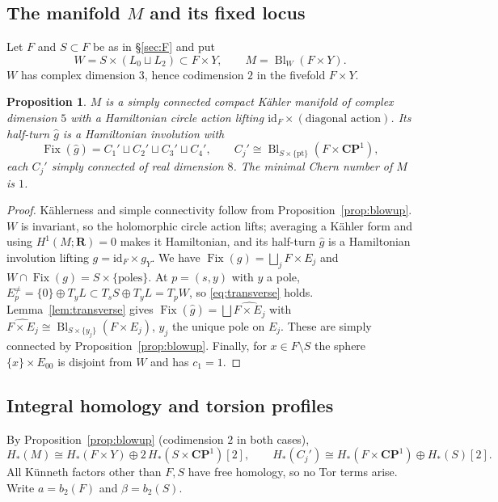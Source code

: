 \documentclass[11pt]{amsart}
\numberwithin{equation}{section}
\newtheorem{proposition}[theorem]{Proposition}
\theoremstyle{definition}
\theoremstyle{remark}
\newcommand{\CP}{\mathbf{CP}}
\newcommand{\R}{\mathbf R}
\DeclareMathOperator{\Fix}{Fix}
\DeclareMathOperator{\Bl}{Bl}
\newcommand{\id}{\mathrm{id}}
\begin{document}
\subsection{The manifold $M$ and its fixed locus}

Let $F$ and $S\subset F$ be as in \S\ref{sec:F} and put
\[
  W=S\times(L_0\sqcup L_2)\subset F\times Y,\qquad
  M=\Bl_W(F\times Y).
\]
$W$ has complex dimension $3$, hence codimension $2$ in the fivefold
$F\times Y$.

\begin{proposition}\label{prop:Mprops}
$M$ is a simply connected compact K\"ahler manifold of complex dimension
$5$ with a Hamiltonian circle action lifting $\id_F\times(\text{diagonal
action})$. Its half-turn $\hat g$ is a Hamiltonian involution with
\[
  \Fix(\hat g)=C_1'\sqcup C_2'\sqcup C_3'\sqcup C_4',\qquad
  C_j'\cong\Bl_{S\times\{\mathrm{pt}\}}(F\times\CP^1),
\]
each $C_j'$ simply connected of real dimension $8$. The minimal Chern number
of $M$ is $1$.
\end{proposition}

\begin{proof}
K\"ahlerness and simple connectivity follow from
Proposition~\ref{prop:blowup}. $W$ is invariant, so the holomorphic circle
action lifts; averaging a K\"ahler form and using $H^1(M;\R)=0$ makes it
Hamiltonian, and its half-turn $\hat g$ is a Hamiltonian involution lifting
$g=\id_F\times g_Y$. We have $\Fix(g)=\bigsqcup_jF\times E_j$ and
$W\cap\Fix(g)=S\times\{\text{poles}\}$. At $p=(s,y)$ with $y$ a pole,
$E^{\ne}_p=\{0\}\oplus T_yL\subset T_sS\oplus T_yL=T_pW$, so
\eqref{eq:transverse} holds. Lemma~\ref{lem:transverse} gives
$\Fix(\hat g)=\bigsqcup\widehat{F\times E_j}$ with
$\widehat{F\times E_j}\cong\Bl_{S\times\{y_j\}}(F\times E_j)$, $y_j$ the
unique pole on $E_j$. These are simply connected by
Proposition~\ref{prop:blowup}. Finally, for $x\in F\setminus S$ the sphere
$\{x\}\times E_{00}$ is disjoint from $W$ and has $c_1=1$.
\end{proof}

\subsection{Integral homology and torsion profiles}

By Proposition~\ref{prop:blowup} (codimension $2$ in both cases),
\begin{equation}\label{eq:HMC}
  H_*(M)\cong H_*(F\times Y)\oplus2\,H_*(S\times\CP^1)[2],\qquad
  H_*(C_j')\cong H_*(F\times\CP^1)\oplus H_*(S)[2].
\end{equation}
All Künneth factors other than $F,S$ have free homology, so no Tor terms
arise. Write $a=b_2(F)$ and $\beta=b_2(S)$.
\end{document}
